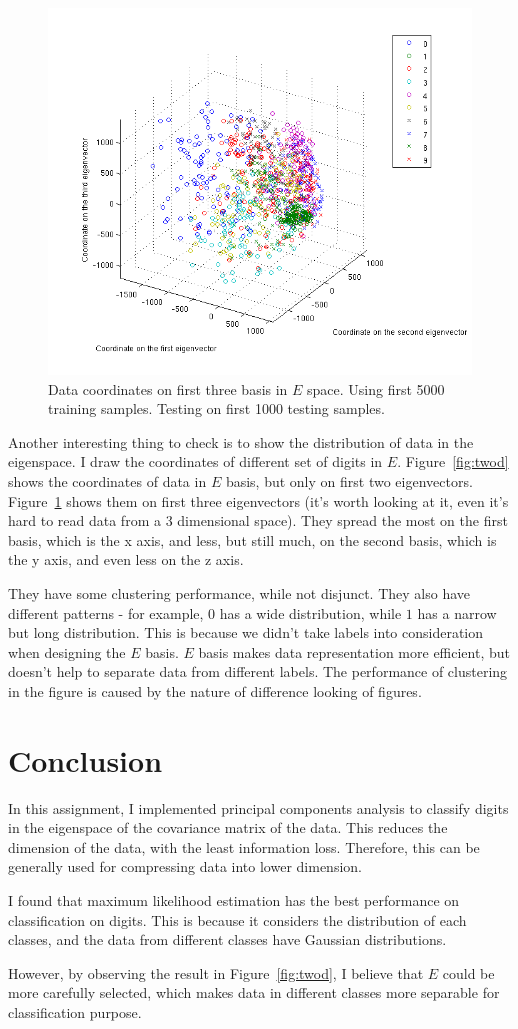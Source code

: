 \documentclass[10pt]{article}
\begin{document}
\begin{figure}
\centering
\includegraphics[width=0.55\columnwidth]{threed_digit.png}
\caption{Data coordinates on first three basis in $E$ space.  Using
first 5000 training samples. Testing on first 1000 testing samples.}
\label{fig:threed}
\end{figure}

Another interesting thing to check is to show the distribution of data
in the eigenspace. I draw the coordinates of different
set of digits in $E$. Figure~\ref{fig:twod} shows the coordinates of
data in $E$ basis, but only on first two eigenvectors.
Figure~\ref{fig:threed} shows them on first three eigenvectors (it's
worth looking at it, even it's hard to read data from a 3 dimensional
space). They
spread the most on the first basis, which is the x axis, and less, but
still much, on the second basis, which is the y axis, and even less on
the z axis.

They have some clustering performance, while not disjunct. They also
have different patterns - for example, $0$ has a wide distribution,
while $1$ has a narrow but long distribution. This is because we
didn't take labels into consideration when designing the $E$ basis.
$E$ basis makes data representation more efficient, but doesn't help
to separate data from different labels. The performance of clustering
in the figure is caused by the nature of difference looking of
figures.

\section{Conclusion}

In this assignment, I implemented principal components analysis to
classify digits in the eigenspace of the covariance matrix of the
data. This reduces the dimension of the data, with the least
information loss. Therefore, this can be generally used for
compressing data into lower dimension.

I found that maximum likelihood estimation has the best performance on
classification on digits. This is because it considers the
distribution of each classes, and the data from different classes have
Gaussian distributions.

However, by observing the result in Figure~\ref{fig:twod}, I believe
that $E$ could be more carefully selected, which makes data in
different classes more separable for classification purpose.
\end{document}
